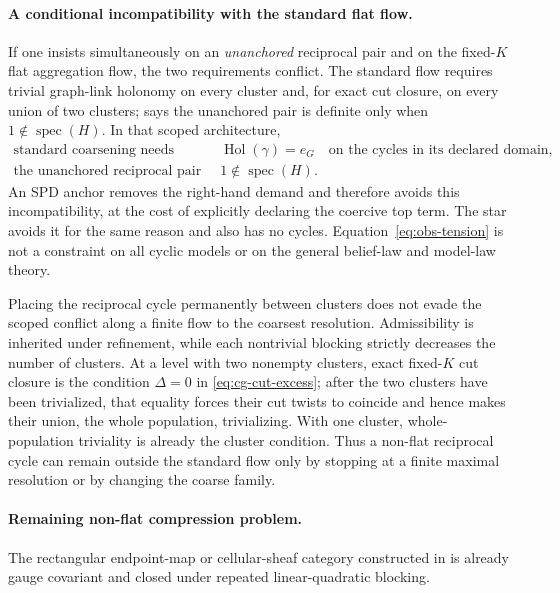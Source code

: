 \paragraph{A conditional incompatibility with the standard flat flow.}
If one insists simultaneously on an \emph{unanchored} reciprocal pair and on the fixed-\(K\) flat aggregation flow, the two requirements conflict. The standard flow requires trivial graph-link holonomy on every cluster and, for exact cut closure, on every union of two clusters;  says the unanchored pair is definite only when \(1\notin\operatorname{spec}(H)\). In that scoped architecture,
\begin{equation}
\begin{aligned}
\text{standard coarsening needs}\quad
&\operatorname{Hol}(\gamma)=e_G
\quad\text{on the cycles in its declared domain},\\
\text{the unanchored reciprocal pair needs}\quad
&1\notin\operatorname{spec}(H).
\end{aligned}
\label{eq:obs-tension}
\end{equation}
An SPD anchor removes the right-hand demand and therefore avoids this incompatibility, at the cost of explicitly declaring the coercive top term. The star avoids it for the same reason and also has no cycles. Equation~\eqref{eq:obs-tension} is not a constraint on all cyclic models or on the general belief-law and model-law theory. 

Placing the reciprocal cycle permanently between clusters does not evade the scoped conflict along a finite flow to the coarsest resolution. Admissibility is inherited under refinement, while each nontrivial blocking strictly decreases the number of clusters. At a level with two nonempty clusters, exact fixed-$K$ cut closure is the condition $\Delta=0$ in \eqref{eq:cg-cut-excess}; after the two clusters have been trivialized, that equality forces their cut twists to coincide and hence makes their union, the whole population, trivializing. With one cluster, whole-population triviality is already the cluster condition. Thus a non-flat reciprocal cycle can remain outside the standard flow only by stopping at a finite maximal resolution or by changing the coarse family. 

\paragraph{Remaining non-flat compression problem.}
The rectangular endpoint-map or cellular-sheaf category constructed in
 is already gauge covariant and closed under repeated
linear-quadratic blocking. 

